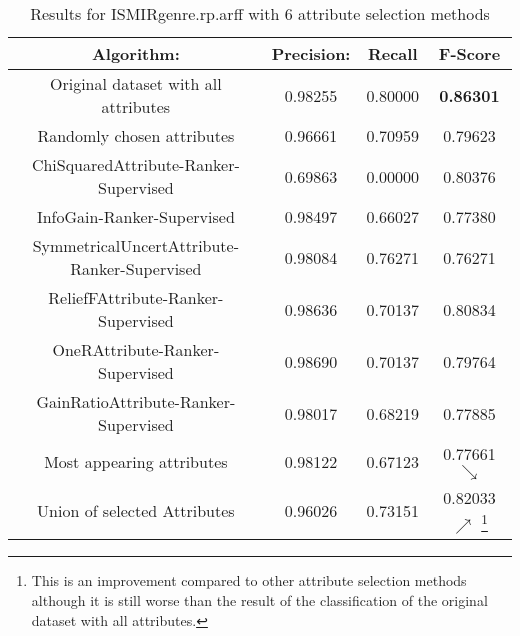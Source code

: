 \begin{table}[p]
\begin{center}
\begin{tabular}{|c|c|c|c|}
\hline Algorithm: & Precision: & Recall & F-Score\\
\hline Original dataset with all attributes  & 0.98255   &  0.80000  &
 {\bf 0.86301}\\
\hline Randomly chosen attributes & 0.96661 & 0.70959 & 0.79623\\
\hline ChiSquaredAttribute-Ranker-Supervised & 0.69863 & 0.00000 & 0.80376\\
\hline InfoGain-Ranker-Supervised & 0.98497 & 0.66027 & 0.77380\\
\hline SymmetricalUncertAttribute-Ranker-Supervised & 0.98084 & 0.76271 &
0.76271\\
\hline ReliefFAttribute-Ranker-Supervised & 0.98636 & 0.70137 & 0.80834\\
\hline OneRAttribute-Ranker-Supervised & 0.98690 & 0.70137 & 0.79764\\
\hline GainRatioAttribute-Ranker-Supervised & 0.98017 & 0.68219 & 0.77885\\
\hline Most appearing attributes & 0.98122 & 0.67123 & 0.77661 $\searrow$\\
\hline Union of selected Attributes & 0.96026 & 0.73151 & 0.82033 $\nearrow$
\footnote{This is an improvement compared to other attribute selection
methods although it is still worse than the result of the classification of
the original dataset with all attributes.}\\

\hline
\end{tabular}
\caption{Results for ISMIRgenre.rp.arff with 6 attribute selection methods}
\label{table:classifier:ISMIRgenre6}
\end{center}
\end{table}



